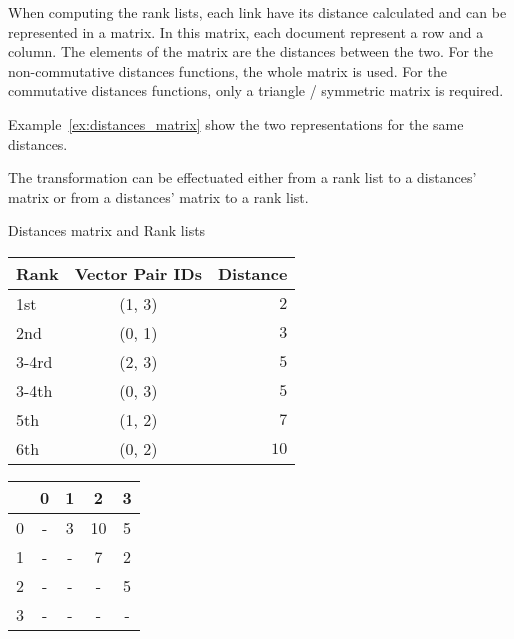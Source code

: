 When computing the rank lists, each link have its distance calculated and can be represented in a matrix.
In this matrix, each document represent a row and a column.
The elements of the matrix are the distances between the two.
For the non-commutative distances functions, the whole matrix is used.
For the commutative distances functions, only a triangle / symmetric matrix is required.

Example~\ref{ex:distances_matrix} show the two representations for the same distances.

The transformation can be effectuated either from a rank list to a distances' matrix or from a distances' matrix to a rank list.

\begin{example}
  \centering
  \caption{Distances matrix and Rank lists}
  \label{ex:distances_matrix}
  \begin{subexample}{\linewidth}
    \centering
    \begin{tabular}{l c r}
      \toprule
      Rank & Vector Pair IDs & Distance \\
      \midrule
      1st   & (1, 3) & $2$ \\
      2nd   & (0, 1) & $3$ \\
      3-4rd & (2, 3) & $5$ \\
      3-4th & (0, 3) & $5$ \\
      5th   & (1, 2) & $7$ \\
      6th   & (0, 2) & $10$ \\
      \bottomrule
    \end{tabular}
  \end{subexample}

  \vspace{0.5cm}

  \begin{subexample}{\linewidth}
    \centering
    \begin{tabular}{c|c c c c}
      \toprule
        & 0 & 1 & 2  & 3 \\
      \midrule
      0 & - & 3 & 10 & 5 \\
      1 & - & - & 7  & 2 \\
      2 & - & - & -  & 5 \\
      3 & - & - & -  & - \\
      \bottomrule
    \end{tabular}
  \end{subexample}
\end{example}

